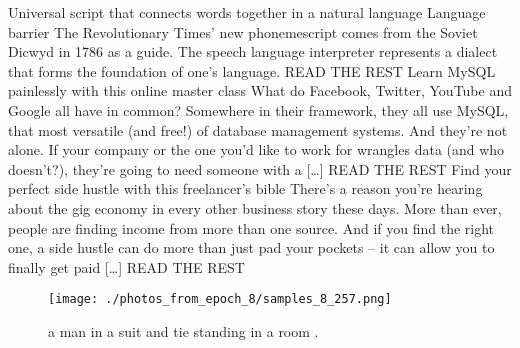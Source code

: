 \documentclass{article}%
\begin{document}
Universal script that connects words together in a natural language Language barrier The Revolutionary Times' new phonemescript comes from the Soviet Dicwyd in 1786 as a guide. The speech language interpreter represents a dialect that forms the foundation of one’s language. READ THE REST\newline%
Learn MySQL painlessly with this online master class What do Facebook, Twitter, YouTube and Google all have in common? Somewhere in their framework, they all use MySQL, that most versatile (and free!) of database management systems. And they’re not alone. If your company or the one you’d like to work for wrangles data (and who doesn’t?), they’re going to need someone with a {[}…{]} READ THE REST\newline%
Find your perfect side hustle with this freelancer's bible There’s a reason you’re hearing about the gig economy in every other business story these days. More than ever, people are finding income from more than one source. And if you find the right one, a side hustle can do more than just pad your pockets – it can allow you to finally get paid {[}…{]} READ THE REST\newline%

%


\begin{figure}[h!]%
\centering%
\texttt{[image: ./photos\_from\_epoch\_8/samples\_8\_257.png]}%
\caption{a man in a suit and tie standing in a room .}%
\end{figure}

%
\end{document}
